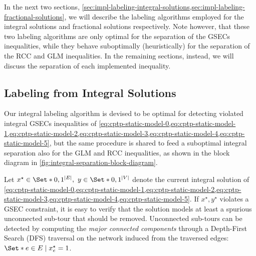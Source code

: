 \medskip

In the next two sections, \cref{sec:impl-labeling-integral-solutions,sec:impl-labeling-fractional-solutions},
we will describe the labeling algorithms employed for the integral solutions
and fractional solutions respectively.
Note however, that these two labeling algorithms
are only optimal for the separation of the GSECs inequalities,
while they behave suboptimally (heuristically) for the separation of the RCC and GLM inequalities.
In the remaining sections, instead,
we will discuss the separation of each implemented inequality.

\subsection{Labeling from Integral Solutions}
\label{sec:impl-labeling-integral-solutions}

Our integral labeling algorithm
is devised to be optimal for detecting violated integral GSECs inequalities
of \cref{eq:cptp-static-model-0,eq:cptp-static-model-1,eq:cptp-static-model-2,eq:cptp-static-model-3,eq:cptp-static-model-4,eq:cptp-static-model-5},
but the same procedure is shared
to feed a suboptimal integral separation also for the GLM and RCC inequalities,
as shown in the block diagram in \cref{fig:integral-separation-block-diagram}.

Let $x^\star \in \Set*{0, 1}^{|E|},\ y \in \Set*{0, 1}^{|V|}$ denote the
current integral solution of
\cref{eq:cptp-static-model-0,eq:cptp-static-model-1,eq:cptp-static-model-2,eq:cptp-static-model-3,eq:cptp-static-model-4,eq:cptp-static-model-5}.
If $x^\star, y^\star$ violates a GSEC constraint,
it is easy to verify that the solution models at least a spurious unconnected sub-tour that should be removed.
Unconnected sub-tours can be detected
by computing the \textit{major connected components}
through a Depth-First Search (DFS) traversal
on the network induced from the traversed edges:  $\Set*{e \in E \mid x^\star_e = 1}$.

\medskip

